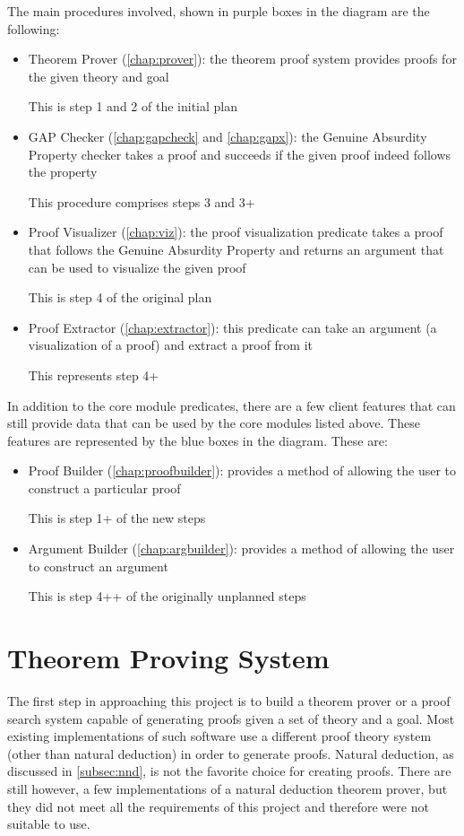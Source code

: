 \documentclass[11pt,twoside,a4paper]{report}
\begin{document}
The main procedures involved, shown in purple boxes in the diagram are the following:
\begin{itemize}
\item
Theorem Prover (\autoref{chap:prover}): the theorem proof system provides proofs for the given theory and goal

This is step 1 and 2 of the initial plan
\item
GAP Checker (\autoref{chap:gapcheck} and \autoref{chap:gapx}): the Genuine Absurdity Property checker takes a proof and succeeds if the given proof indeed follows the property

This procedure comprises steps 3 and 3+
\item
Proof Visualizer (\autoref{chap:viz}): the proof visualization predicate takes a proof that follows the Genuine Absurdity Property and returns an argument that can be used to visualize the given proof

This is step 4 of the original plan
\item
Proof Extractor (\autoref{chap:extractor}): this predicate can take an argument (a visualization of a proof) and extract a proof from it

This represents step 4+
\end{itemize}

In addition to the core module predicates, there are a few client features that can still provide data that can be used by the core modules listed above. These features are represented by the blue boxes in the diagram. These are:
\begin{itemize}
\item
Proof Builder (\autoref{chap:proofbuilder}): provides a method of allowing the user to construct a particular proof

This is step 1+ of the new steps
\item
Argument Builder (\autoref{chap:argbuilder}): provides a method of allowing the user to construct an argument

This is step 4++ of the originally unplanned steps
\end{itemize}

\chapter{Theorem Proving System}
\label{chap:prover}
The first step in approaching this project is to build a theorem prover or a proof search system capable of generating proofs given a set of theory and a goal. Most existing implementations of such software use a different proof theory system (other than natural deduction) in order to generate proofs. Natural deduction, as discussed in \autoref{subsec:nnd}, is not the favorite choice for creating proofs. There are still however, a few implementations of a natural deduction theorem prover, but they did not meet all the requirements of this project and therefore were not suitable to use.
\end{document}
